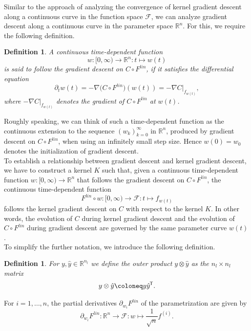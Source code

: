\documentclass[11pt, a4paper]{article}
\newtheorem{definition}[theorem]{Definition}
\newcommand{\R}{\mathbb{R}}
\newcommand{\F}{\mathcal{F}}
\newcommand*{\tr}{^{\mkern-1.5mu\mathsf{T}}}
\begin{document}
Similar to the approach of analyzing the convergence of kernel gradient descent along a continuous curve in the function space $\F$, we can analyze gradient descent along a continuous curve in the parameter space $\R^n$. For this, we require the following definition.

\begin{definition} \label{def:follow}
A continuous time-dependent function 
\[ w : [0,\infty) \to \R^n : t \mapsto w(t) \] 
is said to follow the gradient descent on $C \circ F^\textit{lin}$, if it satisfies the differential equation
\[ \partial_tw(t) = - \nabla \big (C \circ F^\textit{lin} \big ) (w(t)) = - \nabla C|_{f_{w(t)}}, \]
where $- \nabla C|_{f_{w(t)}}$ denotes the gradient of $C \circ F^\textit{lin}$ at $w(t)$.
\end{definition}

Roughly speaking, we can think of such a time-dependent function as the continuous extension to the sequence $(w_k)_{k=0}^\infty$ in $\R^n$, produced by gradient descent on $C \circ F^\textit{lin}$, when using an infinitely small step size. Hence $w(0) = w_0$ denotes the initialization of gradient descent. \\

To establish a relationship between gradient descent and kernel gradient descent, we have to construct a kernel $K$ such that, given a continuous time-dependent function $w: [0, \infty) \to \R^n$ that follows the gradient descent on $C \circ F^\textit{lin}$, the continuous time-dependent function
\[ F^\textit{lin} \circ w : [0, \infty) \to \F : t \mapsto f_{w(t)} \]
follows the kernel gradient descent on $C$ with respect to the kernel $K$. In other words, the evolution of $C$ during kernel gradient descent and the evolution of $C \circ F^\textit{lin}$ during gradient descent are governed by the same parameter curve $w(t)$. \\

To simplify the further notation, we introduce the following definition.

\begin{definition}
For $y, \hat{y} \in \R^{n_l}$ we define the outer product $y \otimes \hat{y}$ as the $n_l \times n_l$ matrix
\[ y \otimes \hat{y} \coloneq y \hat{y} \tr. \]
\end{definition}

For $i=1,\dots,n$, the partial derivatives $\partial_{w_{i}}F^\textit{lin}$ of the parametrization are given by
\[ \partial_{w_{i}}F^\textit{lin} : \R^n \to \F: w \mapsto \frac{1}{\sqrt{n}}f^{(i)}. \]
\end{document}
